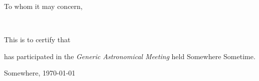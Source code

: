 \documentclass[]{letter}
\date{}
\begin{document}
\begin{letter}{
To whom it may concern,
}

\opening{ ~ }

\thispagestyle{fancy}


This is to certify that 

has participated in the 
{\it 
Generic Astronomical Meeting}
held Somewhere
Sometime.

\closing{Somewhere, \today}


\end{letter}
\end{document}
